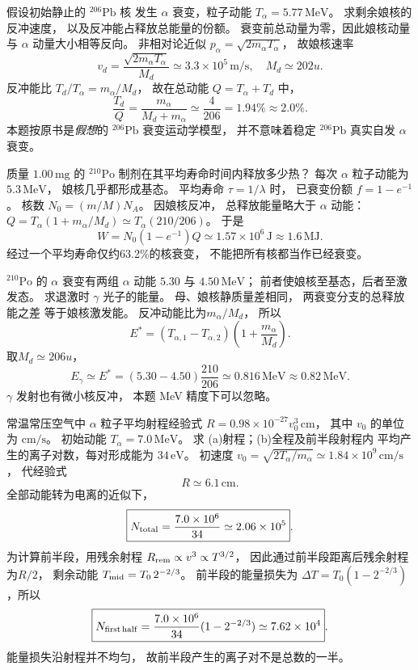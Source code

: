 假设初始静止的 $\mathrm{^{206}Pb}$ 核
发生 $\alpha$ 衰变，粒子动能
$T_\alpha=5.77\,\mathrm{MeV}$。
求剩余娘核的反冲速度，
以及反冲能占释放总能量的份额。
\exsolution
衰变前总动量为零，因此娘核动量与 $\alpha$
动量大小相等反向。
非相对论近似
$p_\alpha=\sqrt{2m_\alpha T_\alpha}$，
故娘核速率
\[
 \boxed{v_d=\frac{\sqrt{2m_\alpha T_\alpha}}{M_d}
 \simeq3.3\times10^5\,\mathrm{m/s}},
 \quad M_d\simeq202u.
\]
反冲能比
$T_d/T_\alpha=m_\alpha/M_d$，
故在总动能
$Q=T_\alpha+T_d$ 中，
\[
 \boxed{\frac{T_d}{Q}
 =\frac{m_\alpha}{M_d+m_\alpha}
 \simeq\frac4{206}=1.94\%\approx2.0\%}.
\]
\excheck 本题按原书是\emph{假想}的
$\mathrm{^{206}Pb}$ 衰变运动学模型，
并不意味着稳定 $\mathrm{^{206}Pb}$ 真实自发 $\alpha$ 衰变。

质量 $1.00\,\mathrm{mg}$ 的 $\mathrm{^{210}Po}$
制剂在其平均寿命时间内释放多少热？
每次 $\alpha$ 粒子动能为 $5.3\,\mathrm{MeV}$，
娘核几乎都形成基态。
\exsolution
平均寿命 $\tau=1/\lambda$ 时，
已衰变份额
$f=1-e^{-1}$。
核数
$N_0=(m/M)N_A$。
因娘核反冲，
总释放能量略大于 $\alpha$ 动能：
$Q=T_\alpha(1+m_\alpha/M_d)
\simeq T_\alpha(210/206)$。
于是
\[
 \boxed{W=N_0(1-e^{-1})Q
 \simeq1.57\times10^6\,\mathrm J
 \approx1.6\,\mathrm{MJ}}.
\]
\excheck 经过一个平均寿命仅约63.2\%的核衰变，
不能把所有核都当作已经衰变。

$\mathrm{^{210}Po}$ 的 $\alpha$ 衰变有两组
$\alpha$ 动能 $5.30$ 与 $4.50\,\mathrm{MeV}$；
前者使娘核至基态，后者至激发态。
求退激时 $\gamma$ 光子的能量。
\exsolution
母、娘核静质量差相同，
两衰变分支的总释放能之差
等于娘核激发能。
反冲动能比为$m_\alpha/M_d$，
所以
\[
 E^*=(T_{\alpha,1}-T_{\alpha,2})
 \left(1+\frac{m_\alpha}{M_d}\right).
\]
取$M_d\simeq206u$，
\[
 \boxed{E_\gamma\simeq E^*
 =(5.30-4.50)\frac{210}{206}
 \simeq0.816\,\mathrm{MeV}\approx0.82\,\mathrm{MeV}}.
\]
\excheck $\gamma$ 发射也有微小核反冲，
本题 MeV 精度下可以忽略。

常温常压空气中 $\alpha$ 粒子平均射程经验式
$R=0.98\times10^{-27}v_0^3\,\mathrm{cm}$，
其中 $v_0$ 的单位为 $\mathrm{cm/s}$。
初始动能 $T_\alpha=7.0\,\mathrm{MeV}$。
求 (a)射程；(b)全程及前半段射程内
平均产生的离子对数，每对形成能为 $34\,\mathrm{eV}$。
\exsolution
初速度
$v_0=\sqrt{2T_\alpha/m_\alpha}
\simeq1.84\times10^9\,\mathrm{cm/s}$，
代经验式
\[
 \boxed{R\simeq6.1\,\mathrm{cm}}.
\]
全部动能转为电离的近似下，
\[
 \boxed{N_{\rm total}=\frac{7.0\times10^6}{34}
 \simeq2.06\times10^5}.
\]
为计算前半段，用残余射程
$R_{\rm rem}\propto v^3\propto T^{3/2}$，
因此通过前半段距离后残余射程为$R/2$，
剩余动能
$T_{\rm mid}=T_0\,2^{-2/3}$。
前半段的能量损失为
$\Delta T=T_0(1-2^{-2/3})$，所以
\[
 \boxed{N_{\rm first\,half}=
 \frac{7.0\times10^6}{34}(1-2^{-2/3})
 \simeq7.62\times10^4}.
\]
\excheck 能量损失沿射程并不均匀，
故前半段产生的离子对不是总数的一半。
